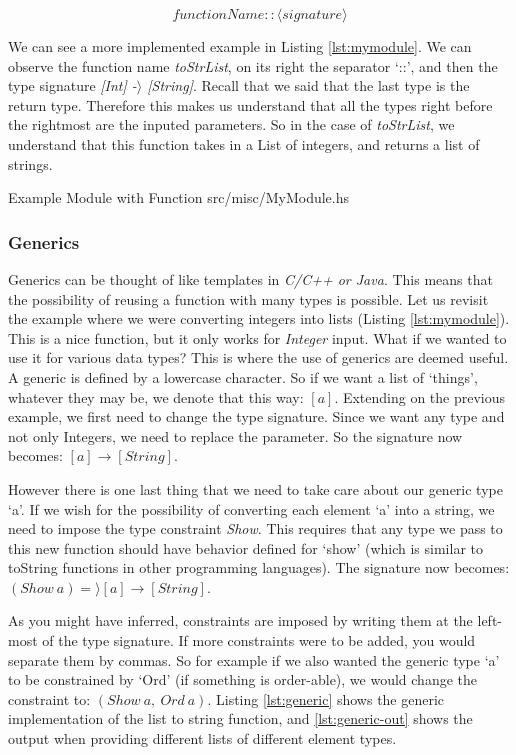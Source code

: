 $$ functionName :: \langle signature \rangle $$

We can see a more implemented example in Listing \ref{lst:mymodule}. We can
observe the function name \textit{toStrList}, on its right the separator `::',
and then the type signature \textit{[Int] -$\rangle$ [String]}. Recall that we
said that the last type is the return type. Therefore this makes us understand
that all the types right before the rightmost are the inputed parameters. So
in the case of \textit{toStrList}, we understand that this function takes in
a List of integers, and returns a list of strings.

%
            {Example Module with Function}%
            {src/misc/MyModule.hs}

\subsubsection{Generics}
Generics can be thought of like templates in \textit{C/C++ or Java}. This means
that the possibility of reusing a function with many types is possible. Let us
revisit the example where we were converting integers into lists (Listing
\ref{lst:mymodule}). 
This is a nice function, but it only works for \textit{Integer} input. What if
we wanted to use it for various data types? This is where the use of generics
are deemed useful. A generic is defined by a lowercase character. So if we want
a list of `things', whatever they may be, we denote that this way: $[a]$.
Extending on the previous example, we first need to change the type signature.
Since we want any type and not only Integers, we need to replace the parameter.
So the signature now becomes: $[a] \rightarrow [String]$.

However there is one last thing that we need to take care about our generic
type `a'. If we wish for the possibility of converting each element `a' into a
string, we need to impose the type constraint \textit{Show}. This requires that
any type we pass to this new function should have behavior defined for `show'
(which is similar to toString functions in other programming languages). The
signature now becomes: $(Show\ a) =\rangle [a] \rightarrow [String] $. 

As you might have inferred, constraints are imposed by writing them at the
left-most of the type signature. If more constraints were to be added, you
would separate them by commas. So for example if we also wanted the generic
type `a' to be constrained by `Ord' (if something is order-able), we would
change the constraint to: $(Show\ a,\ Ord\ a)$. Listing \ref{lst:generic} shows
the generic implementation of the list to string function, and
\ref{lst:generic-out} shows the output when providing different lists of
different element types.

